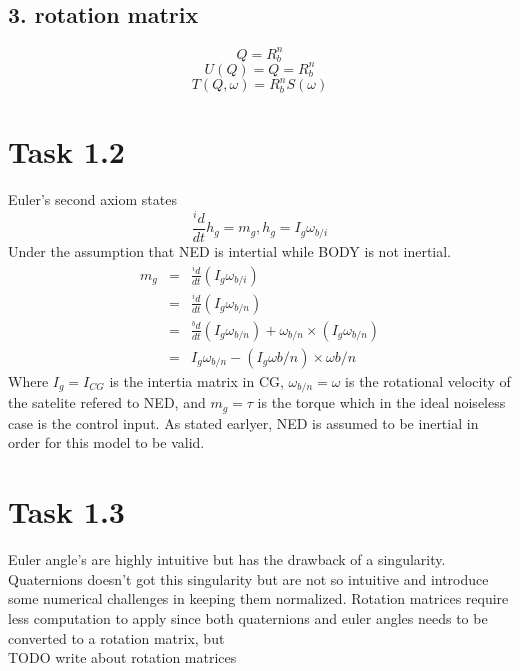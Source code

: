 \documentclass[11pt]{article}
\begin{document}
\subsection*{3. rotation matrix}
\begin{equation}
 Q = R_b^n
\end{equation}
\begin{equation}
 U(Q) = Q = R_b^n
\end{equation}
\begin{equation}
 T(Q,\omega) = R_b^nS(\omega)
\end{equation}

\section*{Task 1.2}
Euler's second axiom states
\[ \frac{^i d}{dt} h_g = m_g, h_g = I_g \omega_{b/i} \]
Under the assumption that NED is intertial while BODY is not inertial.
\begin{eqnarray*}
m_g &=& \frac{^i d}{dt}(I_g \omega_{b/i}) \\
&=& \frac{^i d}{dt}(I_g \omega_{b/n}) \\
&=& \frac{^b d}{dt}(I_g \omega_{b/n}) + \omega_{b/n} \times (I_g \omega_{b/n}) \\
&=& I_g \omega_{b/n} - (I_g \omega{b/n}) \times \omega{b/n}
\end{eqnarray*}
Where $I_g = I_{CG}$ is the intertia matrix in CG, $\omega_{b/n} = \omega$ is the rotational velocity of the satelite refered to NED, and $m_g = \tau$ is the torque which in the ideal noiseless case is the control input. As stated earlyer, NED is assumed to be inertial in order for this model to be valid.

\section*{Task 1.3}
Euler angle's are highly intuitive but has the drawback of a singularity. Quaternions doesn't got this singularity but are not so intuitive and introduce some numerical challenges in keeping them normalized. Rotation matrices require less computation to apply since both quaternions and euler angles needs to be converted to a rotation matrix, but 
\\[+1cm] TODO write about rotation matrices
\end{document}
